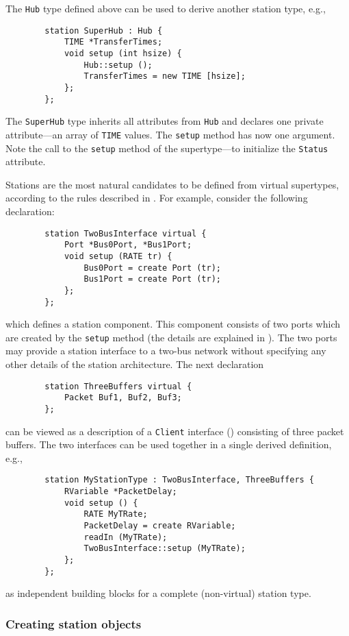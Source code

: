 The {\tt Hub} type defined above can be used to derive another
station type, e.g.,
\begin{verbatim}
        station SuperHub : Hub {
            TIME *TransferTimes;
            void setup (int hsize) {
                Hub::setup ();
                TransferTimes = new TIME [hsize];
            };
        };
\end{verbatim}

The {\tt SuperHub} type inherits all attributes from {\tt Hub} and declares
one private attribute---an array of {\tt TIME} values.
The {\tt setup} method has now one argument.
Note the call to the {\tt setup} method of the supertype---to initialize
the {\tt Status} attribute.

Stations are the most natural candidates to be defined from virtual supertypes,
according to the rules described in .
For example, consider the following declaration:
\begin{verbatim}
        station TwoBusInterface virtual {
            Port *Bus0Port, *Bus1Port;
            void setup (RATE tr) {
                Bus0Port = create Port (tr);
                Bus1Port = create Port (tr);
            };
        };
\end{verbatim}
which defines a station component.
This component consists of two ports which are created by the {\tt setup}
method (the details are explained in ).
The two ports may provide a station interface to a two-bus network without
specifying any other details of the station architecture.
The next declaration
\begin{verbatim}
        station ThreeBuffers virtual {
            Packet Buf1, Buf2, Buf3;
        };
\end{verbatim}
can be viewed as a description of a {\tt Client} interface ()
consisting of three packet buffers.
The two interfaces can be used together in a single derived
definition, e.g.,
\begin{verbatim}
        station MyStationType : TwoBusInterface, ThreeBuffers {
            RVariable *PacketDelay;
            void setup () {
                RATE MyTRate;
                PacketDelay = create RVariable;
                readIn (MyTRate);
                TwoBusInterface::setup (MyTRate);
            };
        };
\end{verbatim}
as independent building blocks for a complete (non-virtual) station type.

\subsubsection{Creating station objects}
\label{rm_to_st_cs}

